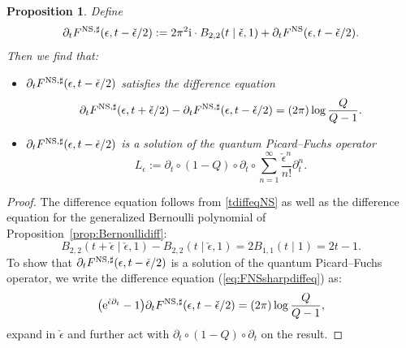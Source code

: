 \documentclass[pdftex]{sigma}
\numberwithin{equation}{section}
\newtheorem{Proposition}[Theorem]{Proposition}
 { \theoremstyle{definition}
\newtheorem{Definition}[Theorem]{Definition}
\newtheorem{Note}[Theorem]{Note}
\newtheorem{Example}[Theorem]{Example}
\newtheorem{Remark}[Theorem]{Remark} }
\begin{document}
\begin{Proposition}
Define
\begin{equation*}
 \partial_t F^{{\rm NS},\sharp}(\epsilon,t-\check{\epsilon}/2) := 2 \pi^2 \mathrm{i}\cdot B_{2,2}(t\mid \check{\epsilon},1) + \partial_t F^{\rm NS}(\epsilon,t-\check{\epsilon}/2).
\end{equation*}
Then we find that:
\begin{itemize}\itemsep=0pt
 \item $\partial_t F^{{\rm NS},\sharp}(\epsilon,t-\check{\epsilon}/2)$ satisfies the difference equation
\begin{equation}\label{eq:FNSsharpdiffeq}
 \partial_t F^{{\rm NS},\sharp}(\epsilon,t+\check{\epsilon}/2)-\partial_t F^{{\rm NS},\sharp}(\epsilon,t-\check\epsilon/2)= (2\pi) \log \frac{Q}{Q-1}.
\end{equation}
\item $\partial_t F^{{\rm NS},\sharp}(\epsilon,t-\check{\epsilon}/2)$ is a solution of the quantum Picard--Fuchs operator
\begin{equation*}
 L_{\epsilon} := \partial_t \circ (1-Q) \circ \partial_t \circ \sum_{n=1}^{\infty} \frac{\check{\epsilon}^n}{n!} \partial_t^n.
\end{equation*}
\end{itemize}
\end{Proposition}

\begin{proof}
The difference equation follows from \eqref{tdiffeqNS} as well as the difference equation for the generalized Bernoulli polynomial of Proposition~\ref{prop:Bernoullidiff}:
\begin{equation*} B_{2,2}(t+\check{\epsilon}\mid \check{\epsilon},1)-B_{2,2}(t\mid \check{\epsilon},1)=2 B_{1,1}(t\mid 1)=2t-1.\end{equation*}
To show that $\partial_t F^{{\rm NS},\sharp}(\epsilon,t-\check{\epsilon}/2)$ is a solution of the quantum Picard--Fuchs operator, we write the difference equation (\ref{eq:FNSsharpdiffeq}) as:
\begin{equation*}
 \big({\rm e}^{\check{\epsilon}\partial_t}-1\big) \partial_t F^{{\rm NS},\sharp}(\epsilon,t-\check{\epsilon}/2)= (2\pi) \log \frac{Q}{Q-1},
\end{equation*}
expand in $\check{\epsilon}$ and further act with $\partial_t \circ (1-Q) \circ \partial_t $ on the result.
\end{proof}
\end{document}

